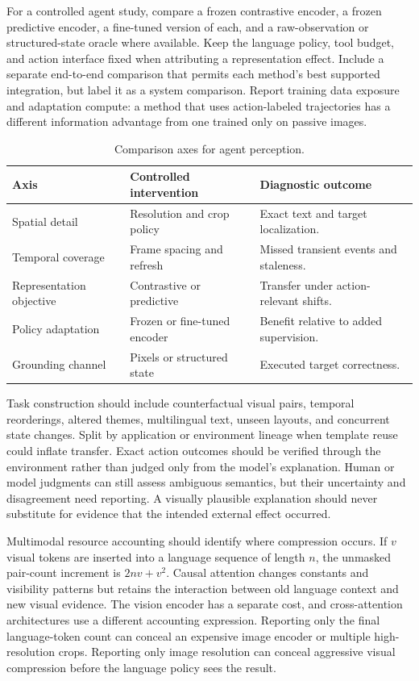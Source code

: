For a controlled agent study, compare a frozen contrastive encoder, a frozen predictive encoder, a fine-tuned version of each, and a raw-observation or structured-state oracle where available. Keep the language policy, tool budget, and action interface fixed when attributing a representation effect. Include a separate end-to-end comparison that permits each method's best supported integration, but label it as a system comparison. Report training data exposure and adaptation compute: a method that uses action-labeled trajectories has a different information advantage from one trained only on passive images.

{\small\setlength{\tabcolsep}{3pt}
\begin{table}[!htbp]
\centering
\caption{Comparison axes for agent perception.}\label{tab:C05:axes}
\begin{tabular}{L{29mm}L{36mm}L{41mm}}

\toprule Axis & Controlled intervention & Diagnostic outcome\\\midrule
Spatial detail & Resolution and crop policy & Exact text and target localization.\\
Temporal coverage & Frame spacing and refresh & Missed transient events and staleness.\\
Representation objective & Contrastive or predictive & Transfer under action-relevant shifts.\\
Policy adaptation & Frozen or fine-tuned encoder & Benefit relative to added supervision.\\
Grounding channel & Pixels or structured state & Executed target correctness.\\
\bottomrule
\end{tabular}
\end{table}
}

Task construction should include counterfactual visual pairs, temporal reorderings, altered themes, multilingual text, unseen layouts, and concurrent state changes. Split by application or environment lineage when template reuse could inflate transfer. Exact action outcomes should be verified through the environment rather than judged only from the model's explanation. Human or model judgments can still assess ambiguous semantics, but their uncertainty and disagreement need reporting. A visually plausible explanation should never substitute for evidence that the intended external effect occurred.

Multimodal resource accounting should identify where compression occurs. If $v$ visual tokens are inserted into a language sequence of length $n$, the unmasked pair-count increment is $2nv+v^2$. Causal attention changes constants and visibility patterns but retains the interaction between old language context and new visual evidence. The vision encoder has a separate cost, and cross-attention architectures use a different accounting expression. Reporting only the final language-token count can conceal an expensive image encoder or multiple high-resolution crops. Reporting only image resolution can conceal aggressive visual compression before the language policy sees the result.

